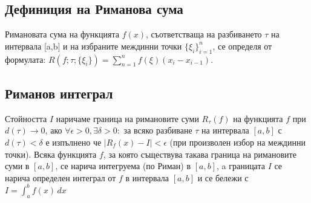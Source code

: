 \documentclass[fleqn,12pt]{article}
\begin{document}
\begin{flushleft}
\subsection{Дефиниция на Риманова сума}
Римановата сума на функцията $f(x)$, съответстваща на разбиването $\tau$ на интервала [a,b] и на избраните междинни точки $\{\xi_i\}_{i=1}^n$, се определя от формулата: 
$R(f;\tau;\{\xi_i\})=\sum_{n = 1}^{n} f(\xi)(x_i-x_{i-1})$.  

\subsection{Риманов интеграл}
Стойността $I$ наричаме граница на римановите суми $R_\tau(f)$ на функцията $f$ при $d(\tau)\rightarrow0$, ако $\forall\epsilon>0, \exists \delta>0 :$ за всяко разбиване $\tau$
на интервала $[a,b]$ с $d(\tau)<\delta$ е изпълнено че $|R_f(x) - I|<\epsilon$ (при произволен избор на междинни точки). Всяка функцията $f$, за която съществува такава граница на римановите суми в $[a,b]$,
се нарича интегруема (по Риман) в $[a,b]$, a границата $I$ се нарича определен интеграл от $f$ в интервала $[a,b]$ и се бележи с $I = \int_{a}^{b}  f(x)\,dx$ 


\end{flushleft}
\end{document}
